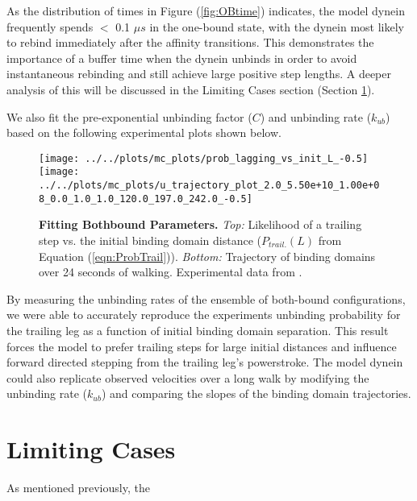 As the distribution of times in Figure (\ref{fig:OBtime}) indicates, the model dynein frequently spends $<$ 0.1 $\mu s$ in the one-bound state, with the dynein most likely to rebind immediately after the affinity transitions. This demonstrates the importance of a buffer time when the dynein unbinds in order to avoid instantaneous rebinding and still achieve large positive step lengths. A deeper analysis of this will be discussed in the Limiting Cases section (Section \ref{sec:LimitingCases}).

We also fit the pre-exponential unbinding factor ($C$) and unbinding rate ($k_{ub}$) based on the following experimental plots shown below.

\begin{figure}[H]
	\centering
	\texttt{[image: ../../plots/mc\_plots/prob\_lagging\_vs\_init\_L\_-0.5]}
	\texttt{[image: ../../plots/mc\_plots/u\_trajectory\_plot\_2.0\_5.50e+10\_1.00e+08\_0.0\_1.0\_1.0\_120.0\_197.0\_242.0\_-0.5]}
	\caption[Fitting Bothbound Parameters]{\textbf{Fitting Bothbound Parameters.} \textit{Top: }Likelihood of a trailing step vs. the initial binding domain distance ($P_{trail.}(L)$ from Equation (\ref{eqn:ProbTrail})). \textit{Bottom: }Trajectory of binding domains over 24 seconds of walking. Experimental data from \cite{Dewitt2012}.}
	\label{fig:BBPlots}
\end{figure}

By measuring the unbinding rates of the ensemble of both-bound configurations, we were able to accurately reproduce the experiments unbinding probability for the trailing leg as a function of initial binding domain separation. This result forces the model to prefer trailing steps for large initial distances and influence forward directed stepping from the trailing leg's powerstroke. The model dynein could also replicate observed velocities over a long walk by modifying the unbinding rate ($k_{ub}$) and comparing the slopes of the binding domain trajectories. 

\section{Limiting Cases}\label{sec:LimitingCases} 

As mentioned previously, the 





